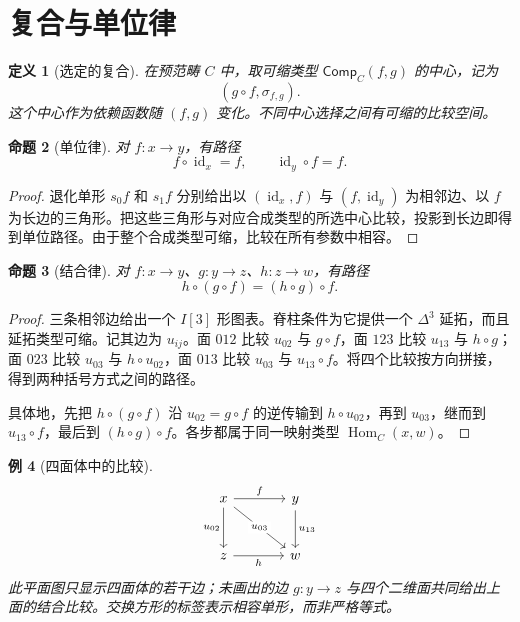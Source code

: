 \documentclass[12pt,oneside,openany,fontset=none]{ctexbook}
\theoremstyle{cn}
\newtheorem{definition}{定义}[chapter]
\newtheorem{example}[definition]{例}
\newtheorem{proposition}[definition]{命题}
\numberwithin{equation}{chapter}
\newcommand{\id}{\operatorname{id}}
\newcommand{\Hom}{\operatorname{Hom}}
\newcommand{\Comp}{\mathsf{Comp}}
\begin{document}
\section{复合与单位律}
\begin{definition}[选定的复合]
在预范畴 $C$ 中，取可缩类型 $\Comp_C(f,g)$ 的中心，记为
\[
(g\circ f,\sigma_{f,g}).
\]
这个中心作为依赖函数随 $(f,g)$ 变化。不同中心选择之间有可缩的比较空间。
\end{definition}
\begin{proposition}[单位律]
对 $f:x\to y$，有路径
\[
f\circ\id_x=f,
\qquad \id_y\circ f=f.
\]
\end{proposition}
\begin{proof}
退化单形 $s_0f$ 和 $s_1f$ 分别给出以 $(\id_x,f)$ 与 $(f,\id_y)$ 为相邻边、以 $f$ 为长边的三角形。把这些三角形与对应合成类型的所选中心比较，投影到长边即得到单位路径。由于整个合成类型可缩，比较在所有参数中相容。
\end{proof}
\begin{proposition}[结合律]
对 $f:x\to y$、$g:y\to z$、$h:z\to w$，有路径
\[
h\circ(g\circ f)=(h\circ g)\circ f.
\]
\end{proposition}
\begin{proof}
三条相邻边给出一个 $I[3]$ 形图表。脊柱条件为它提供一个 $\Delta^3$ 延拓，而且延拓类型可缩。记其边为 $u_{ij}$。面 $012$ 比较 $u_{02}$ 与 $g\circ f$，面 $123$ 比较 $u_{13}$ 与 $h\circ g$；面 $023$ 比较 $u_{03}$ 与 $h\circ u_{02}$，面 $013$ 比较 $u_{03}$ 与 $u_{13}\circ f$。将四个比较按方向拼接，得到两种括号方式之间的路径。

具体地，先把 $h\circ(g\circ f)$ 沿 $u_{02}=g\circ f$ 的逆传输到 $h\circ u_{02}$，再到 $u_{03}$，继而到 $u_{13}\circ f$，最后到 $(h\circ g)\circ f$。各步都属于同一映射类型 $\Hom_C(x,w)$。
\end{proof}
\begin{example}[四面体中的比较]
\[
\begin{tikzcd}[row sep=large,column sep=large]
x\ar[r,"f"]\ar[d,"u_{02}"']\ar[dr,"u_{03}" description]&y\ar[d,"u_{13}"]\\
z\ar[r,"h"']&w
\end{tikzcd}
\]
此平面图只显示四面体的若干边；未画出的边 $g:y\to z$ 与四个二维面共同给出上面的结合比较。交换方形的标签表示相容单形，而非严格等式。
\end{example}
\end{document}
